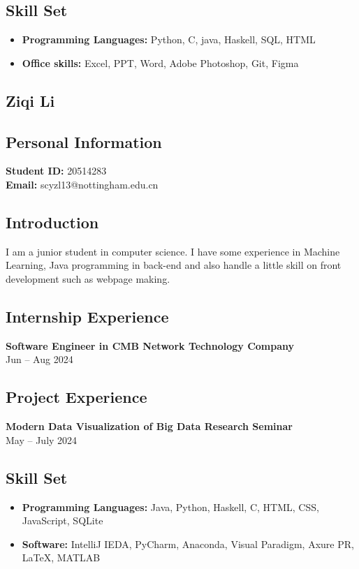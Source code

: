 \documentclass[a4paper,12pt]{article}
\begin{document}
    
    \subsection*{Skill Set}
    \begin{itemize}
        \item \textbf{Programming Languages:} Python, C, java, Haskell, SQL, HTML
        \item \textbf{Office skills:} Excel, PPT, Word, Adobe Photoshop, Git, Figma
    \end{itemize}
    
    \subsection{Ziqi Li}
    \subsection*{Personal Information}
    \textbf{Student ID:} 20514283 \\
    \textbf{Email:} scyzl13@nottingham.edu.cn
    
    \subsection*{Introduction}
    I am a junior student in computer science. I have some experience in Machine Learning, Java programming in back-end and also handle a little skill on front development such as webpage making.
    
    \subsection*{Internship Experience}
    \textbf{Software Engineer in CMB Network Technology Company} \\
    Jun -- Aug 2024
    
    \subsection*{Project Experience}
    \textbf{Modern Data Visualization of Big Data Research Seminar} \\
    May -- July 2024
    
    \subsection*{Skill Set}
    \begin{itemize}
        \item \textbf{Programming Languages:} Java, Python, Haskell, C, HTML, CSS, JavaScript, SQLite
        \item \textbf{Software:} IntelliJ IEDA, PyCharm, Anaconda, Visual Paradigm, Axure PR, LaTeX, MATLAB
    \end{itemize}
    
\end{document}
